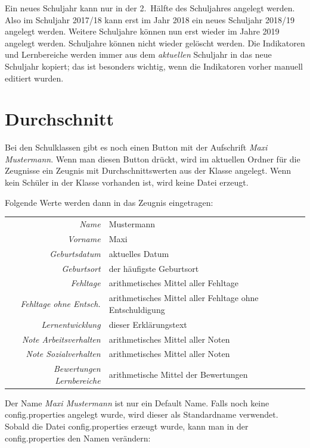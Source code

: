\documentclass[a4paper,notitlepage,parskip]{scrartcl}
\newcommand\ott{\normalfont\ttfamily}
\begin{document}
Ein neues Schuljahr kann nur in der 2.~Hälfte des Schuljahres angelegt werden.
Also im Schuljahr 2017/18 kann erst im Jahr 2018 ein neues Schuljahr 2018/19 angelegt werden. Weitere Schuljahre können nun erst wieder im Jahre 2019 angelegt werden. Schuljahre können nicht wieder gelöscht werden.
Die Indikatoren und Lernbereiche werden immer aus dem \emph{aktuellen} Schuljahr in das neue Schuljahr kopiert; das ist besonders wichtig, wenn die Indikatoren vorher manuell editiert wurden.

\section{Durchschnitt}
Bei den Schulklassen gibt es noch einen Button mit der Aufschrift \emph{Maxi Mustermann}.
Wenn man diesen Button drückt, wird im aktuellen Ordner für die Zeugnisse ein Zeugnis mit Durchschnittswerten aus der Klasse angelegt. Wenn kein Schüler in der Klasse vorhanden ist, wird keine Datei erzeugt.

Folgende Werte werden dann in das Zeugnis eingetragen:

\begin{center}
\begin{tabular}{rl}
\hline
\emph{Name}                    	& Mustermann\\
\emph{Vorname} 					& Maxi\\
\emph{Geburtsdatum} 			& aktuelles Datum\\
\emph{Geburtsort} 				& der häufigste Geburtsort\\
\emph{Fehltage} 				& arithmetisches Mittel aller Fehltage\\
\emph{Fehltage ohne Entsch.} 	& arithmetisches Mittel aller Fehltage ohne Entschuldigung\\
\emph{Lernentwicklung} 			& dieser Erklärungstext\\
\emph{Note Arbeitsverhalten} 	& arithmetisches Mittel aller Noten\\
\emph{Note Sozialverhalten} 	& arithmetisches Mittel aller Noten\\
\emph{Bewertungen Lernbereiche} & arithmetische Mittel der Bewertungen\\
\hline
\end{tabular}
\end{center}


Der Name \emph{Maxi Mustermann} ist nur ein Default Name. Falls noch keine {\ott config.properties} angelegt wurde, wird dieser als Standardname verwendet. Sobald die Datei {\ott config.properties} 
erzeugt wurde, kann man in der {\ott config.properties} den Namen verändern:
\end{document}
